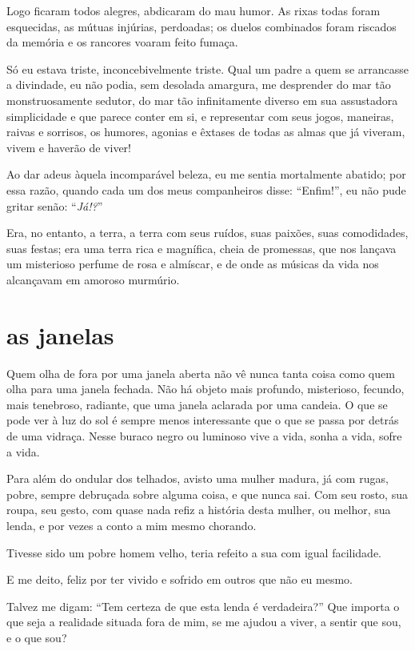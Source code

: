 Logo ficaram todos alegres, abdicaram do mau humor.
As rixas todas foram esquecidas, as mútuas injúrias, perdoadas; os
duelos combinados foram riscados da memória e os rancores voaram
feito fumaça.

Só eu estava triste, inconcebivelmente triste. Qual um padre a
quem se arrancasse a divindade, eu não podia, sem desolada amargura, me
desprender do mar tão monstruosamente sedutor, do mar tão
infinitamente diverso em sua assustadora simplicidade e que parece
conter em si, e representar com seus jogos, maneiras, raivas e
sorrisos, os humores, agonias e êxtases de todas as almas
que já viveram, vivem e haverão de viver!

Ao dar adeus àquela incomparável beleza, eu me sentia mortalmente abatido;
por essa razão, quando cada um dos meus companheiros disse:
“Enfim!'', eu não pude gritar senão:
“\textit{Já!?}'' 

Era, no entanto, a terra, a terra com seus ruídos, suas paixões, suas
comodidades, suas festas; era uma terra rica e magnífica, cheia de
promessas, que nos lançava um misterioso perfume de rosa e almíscar,
e de onde as músicas da vida nos alcançavam em amoroso murmúrio.

\quebra\section[As janelas]{as janelas}

Quem olha de fora por uma janela aberta não vê nunca
tanta coisa como quem olha para uma janela fechada. Não há objeto
mais profundo, misterioso, fecundo, mais tenebroso,
radiante, que uma janela aclarada por uma candeia. O que se pode ver
à luz do sol é sempre menos interessante que o que se passa por
detrás de uma vidraça. Nesse buraco negro ou luminoso vive a vida,
sonha a vida, sofre a vida.

Para além do ondular dos telhados, avisto uma mulher madura, já com
rugas, pobre, sempre debruçada sobre alguma coisa, e que nunca sai. Com
seu rosto, sua roupa, seu gesto, com quase nada refiz a
história desta mulher, ou melhor, sua lenda, e por vezes a conto a mim
mesmo chorando.

Tivesse sido um pobre homem velho, teria refeito a sua com igual
facilidade.

E me deito, feliz por ter vivido e sofrido em outros que não eu mesmo.

Talvez me digam: “Tem certeza de que esta lenda é
verdadeira?'' Que importa o que seja a realidade
situada fora de mim, se me ajudou a viver, a sentir que sou, e o que
sou?

